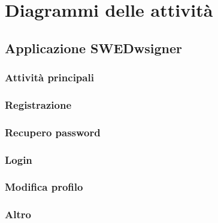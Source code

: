 \section{Diagrammi delle attività}
	\subsection{Applicazione SWEDwsigner}

	\subsubsection{Attività principali}
	\subsubsection{Registrazione}
	\subsubsection{Recupero password}
	\subsubsection{Login}
	\subsubsection{Modifica profilo}
	\subsubsection{Altro}

